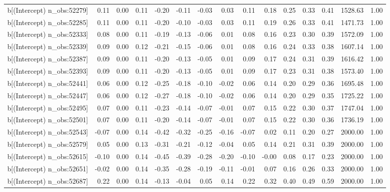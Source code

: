 \begin{table}[ht]
\begin{tabular}{rrrrrrrrrrrrrrr}
  b[(Intercept) n\_obs:52279] & 0.11 & 0.00 & 0.11 & -0.20 & -0.11 & -0.03 & 0.03 & 0.11 & 0.18 & 0.25 & 0.33 & 0.41 & 1528.63 & 1.00 \\ 
  b[(Intercept) n\_obs:52285] & 0.11 & 0.00 & 0.11 & -0.20 & -0.10 & -0.03 & 0.03 & 0.11 & 0.19 & 0.26 & 0.33 & 0.41 & 1471.73 & 1.00 \\ 
  b[(Intercept) n\_obs:52333] & 0.08 & 0.00 & 0.11 & -0.19 & -0.13 & -0.06 & 0.01 & 0.08 & 0.16 & 0.23 & 0.30 & 0.39 & 1572.09 & 1.00 \\ 
  b[(Intercept) n\_obs:52339] & 0.09 & 0.00 & 0.12 & -0.21 & -0.15 & -0.06 & 0.01 & 0.08 & 0.16 & 0.24 & 0.33 & 0.38 & 1607.14 & 1.00 \\ 
  b[(Intercept) n\_obs:52387] & 0.09 & 0.00 & 0.11 & -0.20 & -0.13 & -0.05 & 0.01 & 0.09 & 0.17 & 0.24 & 0.31 & 0.39 & 1616.42 & 1.00 \\ 
  b[(Intercept) n\_obs:52393] & 0.09 & 0.00 & 0.11 & -0.20 & -0.13 & -0.05 & 0.01 & 0.09 & 0.17 & 0.23 & 0.31 & 0.38 & 1573.40 & 1.00 \\ 
  b[(Intercept) n\_obs:52441] & 0.06 & 0.00 & 0.12 & -0.25 & -0.18 & -0.10 & -0.02 & 0.06 & 0.14 & 0.20 & 0.29 & 0.36 & 1695.48 & 1.00 \\ 
  b[(Intercept) n\_obs:52447] & 0.06 & 0.00 & 0.12 & -0.27 & -0.18 & -0.10 & -0.02 & 0.06 & 0.14 & 0.20 & 0.29 & 0.35 & 1725.22 & 1.00 \\ 
  b[(Intercept) n\_obs:52495] & 0.07 & 0.00 & 0.11 & -0.23 & -0.14 & -0.07 & -0.01 & 0.07 & 0.15 & 0.22 & 0.30 & 0.37 & 1747.04 & 1.00 \\ 
  b[(Intercept) n\_obs:52501] & 0.07 & 0.00 & 0.11 & -0.20 & -0.14 & -0.07 & -0.01 & 0.07 & 0.15 & 0.22 & 0.30 & 0.36 & 1736.19 & 1.00 \\ 
  b[(Intercept) n\_obs:52543] & -0.07 & 0.00 & 0.14 & -0.42 & -0.32 & -0.25 & -0.16 & -0.07 & 0.02 & 0.11 & 0.20 & 0.27 & 2000.00 & 1.00 \\ 
  b[(Intercept) n\_obs:52579] & 0.05 & 0.00 & 0.13 & -0.31 & -0.21 & -0.12 & -0.04 & 0.05 & 0.14 & 0.21 & 0.31 & 0.39 & 2000.00 & 1.00 \\ 
  b[(Intercept) n\_obs:52615] & -0.10 & 0.00 & 0.14 & -0.45 & -0.39 & -0.28 & -0.20 & -0.10 & -0.00 & 0.08 & 0.17 & 0.23 & 2000.00 & 1.00 \\ 
  b[(Intercept) n\_obs:52651] & -0.02 & 0.00 & 0.14 & -0.35 & -0.28 & -0.19 & -0.11 & -0.01 & 0.07 & 0.16 & 0.26 & 0.33 & 2000.00 & 1.00 \\ 
  b[(Intercept) n\_obs:52687] & 0.22 & 0.00 & 0.14 & -0.13 & -0.04 & 0.05 & 0.14 & 0.22 & 0.32 & 0.40 & 0.49 & 0.59 & 2000.00 & 1.00 \\ 

\end{tabular}
\end{table}

